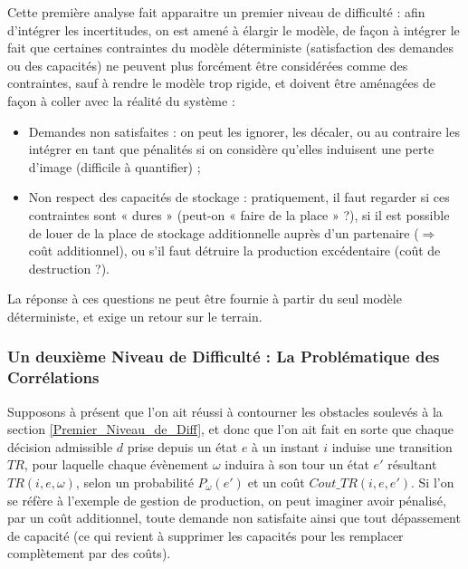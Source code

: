 Cette première analyse fait apparaitre un premier niveau de difficulté : afin d'intégrer les incertitudes, on est amené à élargir le modèle, de façon à intégrer le fait que certaines contraintes du modèle déterministe (satisfaction des demandes ou des capacités) ne peuvent plus forcément être considérées comme des contraintes, sauf à rendre le modèle trop rigide, et doivent être aménagées de façon à coller avec la réalité du système :
\begin{itemize}[label=$\square$]
	\item	Demandes non satisfaites : on peut les ignorer, les décaler, ou au contraire les intégrer en tant que pénalités si on considère qu'elles induisent une perte d'image (difficile à quantifier) ;
	\item	Non respect des capacités de stockage : pratiquement, il faut regarder si ces contraintes sont « dures » (peut-on « faire de la place » ?), si il est possible de louer de la place de stockage additionnelle auprès d'un partenaire ($\Rightarrow$ coût additionnel), ou s'il faut détruire la production excédentaire (coût de destruction ?). 
\end{itemize}
La réponse à ces questions ne peut être fournie à partir du seul modèle déterministe, et exige un retour sur le terrain. 

\subsubsection{Un deuxième Niveau de Difficulté : La Problématique des Corrélations}
 \label{markov}
Supposons à présent que l'on ait réussi à contourner les obstacles soulevés à la section \ref{Premier_Niveau_de_Diff}, et donc que l'on ait fait en sorte que chaque décision admissible $d$ prise depuis un état $e$ à un instant $i$ induise une transition $TR$, pour laquelle chaque évènement $\omega$ induira à son tour un état $e'$ résultant $TR(i, e, \omega)$, selon un probabilité $P_\omega (e')$et un coût $ Cout\_TR(i, e, e')$. Si l'on se réfère à l'exemple de gestion de production, on peut imaginer avoir pénalisé, par un coût additionnel, toute demande non satisfaite ainsi que tout dépassement de capacité (ce qui revient à supprimer les capacités pour les remplacer complètement par des coûts). 

